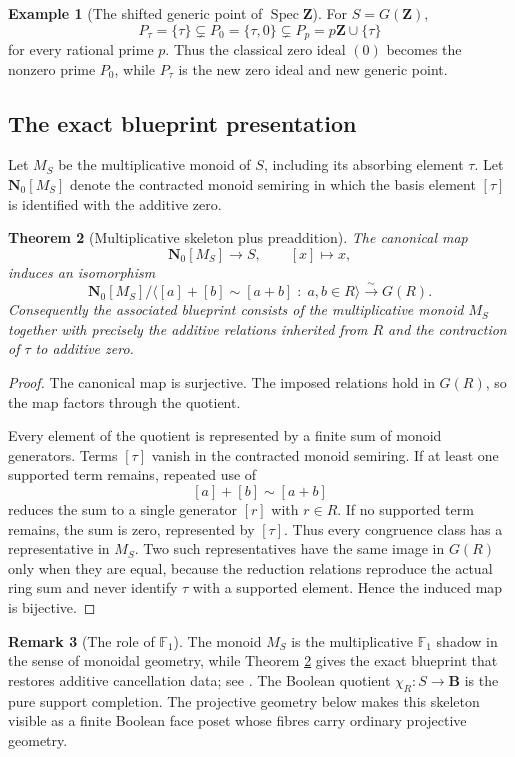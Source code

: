\documentclass[11pt]{amsart}
\numberwithin{equation}{section}
\newtheorem{theorem}{Theorem}[section]
\theoremstyle{definition}
\newtheorem{example}[theorem]{Example}
\newtheorem{remark}[theorem]{Remark}
\newcommand{\B}{\mathbf B}
\newcommand{\Z}{\mathbf Z}
\newcommand{\N}{\mathbf N}
\newcommand{\Spec}{\operatorname{Spec}}
\begin{document}
\begin{example}[The shifted generic point of $\Spec\Z$]
For $S=G(\Z)$,
\[
P_\tau=\{\tau\}
\subsetneq
P_0=\{\tau,0\}
\subsetneq
P_p=p\Z\cup\{\tau\}
\]
for every rational prime $p$.  Thus the classical zero ideal $(0)$ becomes the nonzero prime $P_0$, while $P_\tau$ is the new zero ideal and new generic point.
\end{example}

\subsection{The exact blueprint presentation}

Let $M_S$ be the multiplicative monoid of $S$, including its absorbing element $\tau$.  Let $\N_0[M_S]$ denote the contracted monoid semiring in which the basis element $[\tau]$ is identified with the additive zero.

\begin{theorem}[Multiplicative skeleton plus preaddition]\label{thm:blueprint-presentation}
The canonical map
\[
\N_0[M_S]\longrightarrow S,
\qquad
[x]\longmapsto x,
\]
induces an isomorphism
\[
\N_0[M_S]\Big/\Big\langle [a]+[b]\sim[a+b]
\;:\;a,b\in R\Big\rangle
\xrightarrow{\sim}
G(R).
\]
Consequently the associated blueprint consists of the multiplicative monoid $M_S$ together with precisely the additive relations inherited from $R$ and the contraction of $\tau$ to additive zero.
\end{theorem}

\begin{proof}
The canonical map is surjective.  The imposed relations hold in $G(R)$, so the map factors through the quotient.

Every element of the quotient is represented by a finite sum of monoid generators.  Terms $[\tau]$ vanish in the contracted monoid semiring.  If at least one supported term remains, repeated use of
\[
[a]+[b]\sim[a+b]
\]
reduces the sum to a single generator $[r]$ with $r\in R$.  If no supported term remains, the sum is zero, represented by $[\tau]$.  Thus every congruence class has a representative in $M_S$.  Two such representatives have the same image in $G(R)$ only when they are equal, because the reduction relations reproduce the actual ring sum and never identify $\tau$ with a supported element.  Hence the induced map is bijective.
\end{proof}

\begin{remark}[The role of $\mathbb F_1$]
The monoid $M_S$ is the multiplicative $\mathbb F_1$ shadow in the sense of monoidal geometry, while Theorem \ref{thm:blueprint-presentation} gives the exact blueprint that restores additive cancellation data; see \cite{Deitmar,Lorscheid}.  The Boolean quotient $\chi_R:S\to\B$ is the pure support completion.  The projective geometry below makes this skeleton visible as a finite Boolean face poset whose fibres carry ordinary projective geometry.
\end{remark}
\end{document}
